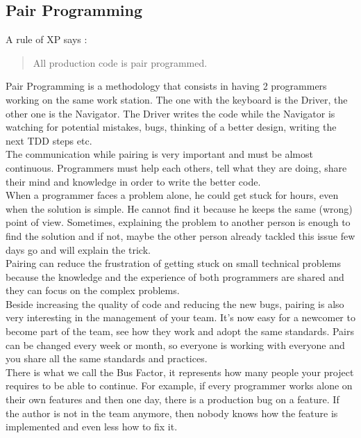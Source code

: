 \subsection{Pair Programming}\label{subsec:pair-programming}
A rule of XP says :
\begin{quotation}
    All production code is pair programmed.
\end{quotation}
Pair Programming is a methodology that consists in having 2 programmers
working on the same work station.
The one with the keyboard is the Driver, the other one is the Navigator.
The Driver writes the code while the Navigator is watching for potential
mistakes, bugs, thinking of a better design, writing the next TDD steps
etc. \\
\newline
The communication while pairing is very important and must be almost
continuous.
Programmers must help each others, tell what they are doing, share their
mind and knowledge in order to write the better code. \\
When a programmer faces a problem alone, he could get stuck for hours,
even when the solution is simple.
He cannot find it because he keeps the same (wrong) point of view.
Sometimes, explaining the problem to another person is enough to find
the solution and if not, maybe the other person already tackled this
issue few days go and will explain the trick. \\
Pairing can reduce the frustration of getting stuck on small technical
problems because the knowledge and the experience of both programmers
are shared and they can focus on the complex problems. \\
\newline
Beside increasing the quality of code and reducing the new bugs, pairing
is also very interesting in the management of your team.
It's now easy for a newcomer to become part of the team, see how they
work and adopt the same standards.
Pairs can be changed every week or month, so everyone is working with
everyone and you share all the same standards and practices. \\
There is what we call the Bus Factor, it represents how many people your
project requires to be able to continue.
For example, if every programmer works alone on their own features and
then one day, there is a production bug on a feature.
If the author is not in the team anymore, then nobody knows how the
feature is implemented and even less how to fix it. \\
